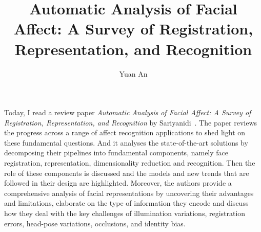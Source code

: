 \documentclass[10pt,twocolumn,letterpaper]{article}
\begin{document}
	\title{Automatic Analysis of Facial Affect: A Survey of Registration, Representation, and Recognition}	
	\author{Yuan An}
	\maketitle
	Today, I read a review paper \emph{Automatic Analysis of Facial Affect: A Survey of Registration, Representation, and Recognition} by Sariyanidi~\cite{Auto}. The paper reviews the progress across a range of affect recognition applications to shed light on these fundamental questions. And it analyses the state-of-the-art solutions by decomposing their pipelines into fundamental components, namely face registration, representation, dimensionality reduction and recognition. Then the role of these components is discussed and the models and new trends that are followed in their design are highlighted. Moreover, the authors provide a comprehensive analysis of facial representations by uncovering their advantages and limitations, elaborate on the type of information they encode and discuss how they deal with the key challenges of illumination variations, registration errors, head-pose variations, occlusions, and identity bias.
\end{document}
